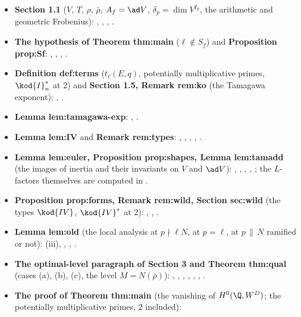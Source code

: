 \begin{itemize}
\item \textbf{Section 1.1} ($V$, $T$, $\rho$, $\bar\rho$, $A_f=\ad V$, $\delta_p=\dim V^{I_p}$, the arithmetic and geometric Frobenius):
, , , .
\item \textbf{The hypothesis of Theorem thm:main} ($\ell\notin S_f$) and \textbf{Proposition prop:Sf}: ,
, , .
\item \textbf{Definition def:terms} ($t_\ell(E,q)$, potentially multiplicative primes, $\kod{I}_n^*$ at $2$) and \textbf{Section 1.5, Remark rem:ko}
(the Tamagawa exponent): , .
\item \textbf{Lemma lem:tamagawa-exp}: , .
\item \textbf{Lemma lem:IV} and \textbf{Remark rem:types}: , ,
, , .
\item \textbf{Lemma lem:euler, Proposition prop:shapes, Lemma lem:tamadd} (the images of inertia and their invariants on $V$ and $\ad V$):
, , , , ;
the $L$-factors themselves are computed in .
\item \textbf{Proposition prop:forms, Remark rem:wild, Section sec:wild} (the types $\kod{IV}$, $\kod{IV}^*$ at $2$): ,
, .
\item \textbf{Lemma lem:old} (the local analysis at $p\nmid\ell N$, at $p=\ell$, at $p\,\|\,N$ ramified or not): (iii),
, , .
\item \textbf{The optimal-level paragraph of Section 3 and Theorem thm:qual} (cases (a), (b), (c), the level $M=N(\bar\rho)$):
, , , ,
, , .
\item \textbf{The proof of Theorem thm:main} (the vanishing of $H^0(\Q,W^D)$; the potentially multiplicative primes, $2$ included):

\end{itemize}
